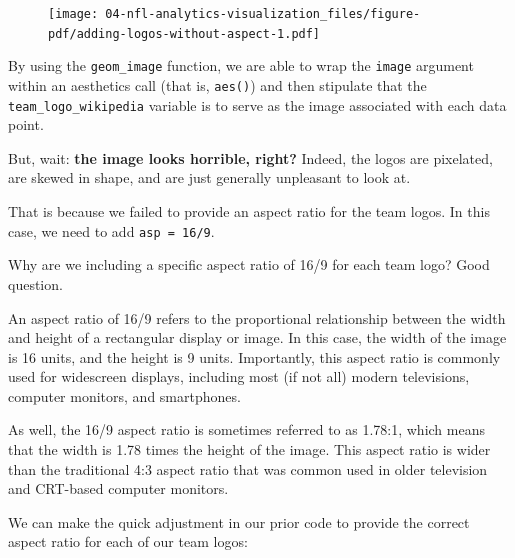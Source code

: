 \documentclass[
  letterpaper,
]{krantz}
\begin{document}
\begin{figure}[H]

{\centering \texttt{[image: 04-nfl-analytics-visualization\_files/figure-pdf/adding-logos-without-aspect-1.pdf]}

}

\end{figure}

By using the \texttt{geom\_image} function, we are able to wrap the
\texttt{image} argument within an aesthetics call (that is,
\texttt{aes()}) and then stipulate that the
\texttt{team\_logo\_wikipedia} variable is to serve as the image
associated with each data point.

But, wait: \textbf{the image looks horrible, right?} Indeed, the logos
are pixelated, are skewed in shape, and are just generally unpleasant to
look at.

That is because we failed to provide an aspect ratio for the team logos.
In this case, we need to add \texttt{asp\ =\ 16/9}.

\begin{tcolorbox}[enhanced jigsaw, left=2mm, toprule=.15mm, opacitybacktitle=0.6, leftrule=.75mm, bottomrule=.15mm, colbacktitle=quarto-callout-note-color!10!white, breakable, colback=white, bottomtitle=1mm, toptitle=1mm, title=\textcolor{quarto-callout-note-color}{\faInfo}\hspace{0.5em}{Note}, coltitle=black, titlerule=0mm, arc=.35mm, opacityback=0, colframe=quarto-callout-note-color-frame, rightrule=.15mm]

Why are we including a specific aspect ratio of 16/9 for each team logo?
Good question.

An aspect ratio of 16/9 refers to the proportional relationship between
the width and height of a rectangular display or image. In this case,
the width of the image is 16 units, and the height is 9 units.
Importantly, this aspect ratio is commonly used for widescreen displays,
including most (if not all) modern televisions, computer monitors, and
smartphones.

As well, the 16/9 aspect ratio is sometimes referred to as 1.78:1, which
means that the width is 1.78 times the height of the image. This aspect
ratio is wider than the traditional 4:3 aspect ratio that was common
used in older television and CRT-based computer monitors.

\end{tcolorbox}

We can make the quick adjustment in our prior code to provide the
correct aspect ratio for each of our team logos:
\end{document}
